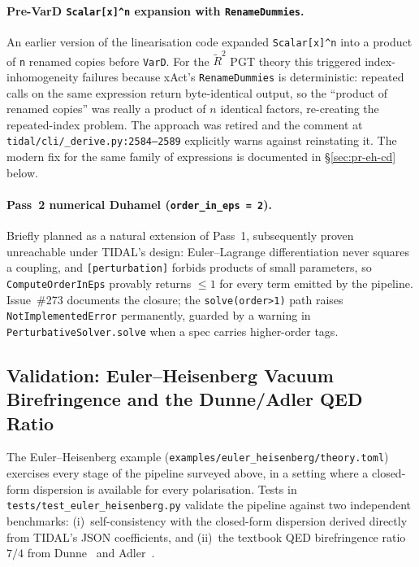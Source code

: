 \paragraph{Pre-VarD \texttt{Scalar[x]\textasciicircum n} expansion with \texttt{RenameDummies}.} An earlier version of the linearisation code expanded \texttt{Scalar[x]\textasciicircum n} into a product of \texttt{n} renamed copies before \texttt{VarD}. For the $\tilde{R}^2$ PGT theory this triggered index-inhomogeneity failures because xAct's \texttt{RenameDummies} is deterministic: repeated calls on the same expression return byte-identical output, so the ``product of renamed copies'' was really a product of $n$ identical factors, re-creating the repeated-index problem. The approach was retired and the comment at \texttt{tidal/cli/\_derive.py:2584--2589} explicitly warns against reinstating it. The modern fix for the same family of expressions is documented in \S\ref{sec:pr-eh-cd} below.

\paragraph{Pass~2 numerical Duhamel (\texttt{order\_in\_eps = 2}).} Briefly planned as a natural extension of Pass~1, subsequently proven unreachable under TIDAL's design: Euler--Lagrange differentiation never squares a coupling, and \texttt{[perturbation]} forbids products of small parameters, so \texttt{ComputeOrderInEps} provably returns $\le 1$ for every term emitted by the pipeline. Issue~\#273 documents the closure; the \texttt{solve(order\textgreater{}1)} path raises \texttt{NotImplementedError} permanently, guarded by a warning in \texttt{PerturbativeSolver.solve} when a spec carries higher-order tags.

\subsection{Validation: Euler--Heisenberg Vacuum Birefringence and the Dunne/Adler QED Ratio}
\label{sec:pr-eh-validation}

The Euler--Heisenberg example (\texttt{examples/euler\_heisenberg/theory.toml}) exercises every stage of the pipeline surveyed above, in a setting where a closed-form dispersion is available for every polarisation. Tests in \texttt{tests/test\_euler\_heisenberg.py} validate the pipeline against two independent benchmarks: (i)~self-consistency with the closed-form dispersion derived directly from TIDAL's JSON coefficients, and (ii)~the textbook QED birefringence ratio $7/4$ from Dunne~\cite{Dunne2004} and Adler~\cite{Adler1971}.

